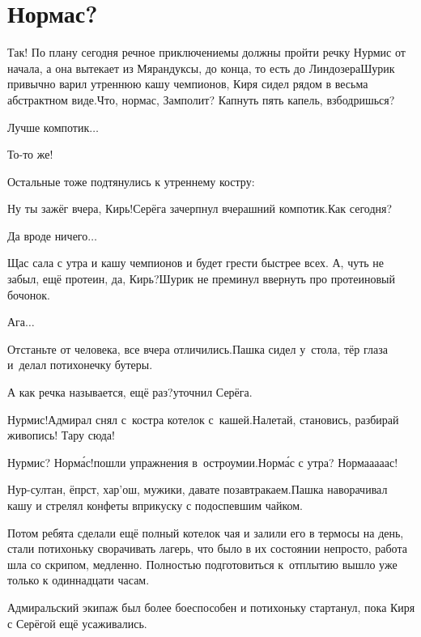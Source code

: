 \chapter{Нормас?}
\vepsianrose

\diagdash Так! По плану сегодня речное приключение\mdash мы должны пройти речку Нурмис от начала, а она вытекает из Мярандуксы, до конца, то есть до Линдозера\mdash Шурик привычно варил утреннюю кашу чемпионов, Киря сидел рядом в весьма абстрактном виде.\mdash Что, нормас, Замполит? Капнуть пять капель, взбодришься?

\diagdash Лучше компотик$\ldots$

\diagdash То-то же!

Остальные тоже подтянулись к утреннему костру:

\diagdash Ну ты зажёг вчера, Кирь!\mdash Серёга зачерпнул вчерашний компотик.\mdash Как сегодня?

\diagdash Да вроде ничего$\ldots$

\diagdash Щас сала с утра и кашу чемпионов и будет грести быстрее всех. А, чуть не забыл, ещё протеин, да, Кирь?\mdash Шурик не преминул ввернуть про протеиновый бочонок.

\diagdash Ага$\ldots$

\diagdash Отстаньте от человека, все вчера отличились.\mdash Пашка сидел у~стола, тёр глаза и~делал потихонечку бутеры.

\diagdash А как речка называется, ещё раз?\mdash уточнил Серёга.

\diagdash Нурмис!\mdash Адмирал снял с~костра котелок с~кашей.\mdash Налетай, становись, разбирай живопись! Тару сюда!

\diagdash Нурмис? Норм{\'а}с!\mdash пошли упражнения в~остроумии.\mdash Норм{\'а}с с утра?  Норма\sdash а\sdash а\sdash а\sdash ас!

\diagdash Нур-султан, ёпрст, хар{'о}ш, мужики, давате позавтракаем.\mdash Пашка наворачивал кашу и стрелял конфеты вприкуску с подоспевшим чайком.

Потом ребята сделали ещё полный котелок чая и залили его в термосы на день, стали потихоньку сворачивать лагерь, что было в их состоянии непросто, работа шла со скрипом, медленно. Полностью подготовиться к~отплытию вышло уже только к одиннадцати часам.

Адмиральский экипаж был более боеспособен и потихоньку стартанул, пока Киря с Серёгой ещё усаживались. 

